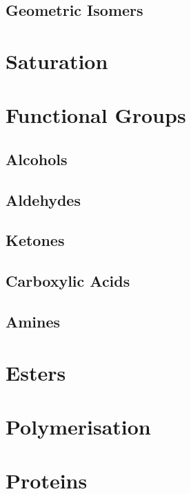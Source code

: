 \documentclass[a4paper,11pt]{article}
\begin{document}
\subsection{Geometric Isomers}


\section{Saturation}



\section{Functional Groups}

\subsection{Alcohols}

\subsection{Aldehydes}

\subsection{Ketones}

\subsection{Carboxylic Acids}

\subsection{Amines}


\section{Esters}


\section{Polymerisation}


\section{Proteins}
\end{document}
